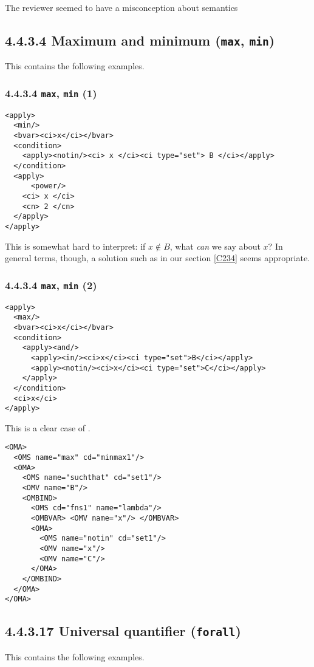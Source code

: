 \documentclass{llncs}
\begin{document}
\begin{newpart}{The reviewer seemed to have a misconception about semantics}
\subsection{4.4.3.4 Maximum and minimum ({\tt max}, {\tt min})}\label{4434}
This contains the following examples.
\subsubsection{4.4.3.4 {\tt max}, {\tt min} (1)}\label{44341}
\begin{lstlisting}[language=MathML2]
<apply>
  <min/>
  <bvar><ci>x</ci></bvar>
  <condition>
    <apply><notin/><ci> x </ci><ci type="set"> B </ci></apply>
  </condition>
  <apply>
      <power/>
    <ci> x </ci>
    <cn> 2 </cn>
  </apply>
</apply>
\end{lstlisting}
This is somewhat hard to interpret: if $x\notin B$, what {\emph{can}} we say
about $x$? In general terms, though, a solution such as in our section
\ref{C234} seems appropriate.
\subsubsection{4.4.3.4 {\tt max}, {\tt min} (2)}\label{44342}
\begin{lstlisting}[language=MathML2]
<apply>
  <max/>
  <bvar><ci>x</ci></bvar>
  <condition>
    <apply><and/>
      <apply><in/><ci>x</ci><ci type="set">B</ci></apply>
      <apply><notin/><ci>x</ci><ci type="set">C</ci></apply>
    </apply>
  </condition>
  <ci>x</ci>
</apply>
\end{lstlisting}
This is a clear case of {}.
\begin{lstlisting}
<OMA>
  <OMS name="max" cd="minmax1"/>
  <OMA>
    <OMS name="suchthat" cd="set1"/>
    <OMV name="B"/>
    <OMBIND>
      <OMS cd="fns1" name="lambda"/>
      <OMBVAR> <OMV name="x"/> </OMBVAR>
      <OMA>
        <OMS name="notin" cd="set1"/>
        <OMV name="x"/>
        <OMV name="C"/>
      </OMA>
    </OMBIND>
  </OMA>
</OMA>
\end{lstlisting}
\subsection{4.4.3.17 Universal quantifier ({\tt forall})}\label{44317}
This contains the following examples.

\end{newpart}
\end{document}
